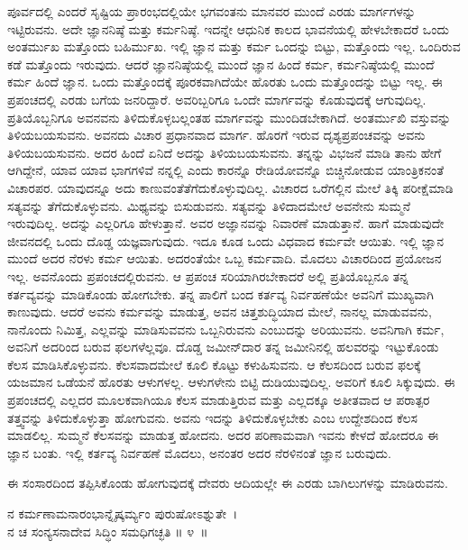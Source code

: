 ಪೂರ್ವದಲ್ಲಿ ಎಂದರೆ ಸೃಷ್ಟಿಯ ಪ್ರಾರಂಭದಲ್ಲಿಯೇ ಭಗವಂತನು ಮಾನವರ ಮುಂದೆ ಎರಡು ಮಾರ್ಗಗಳನ್ನು ಇಟ್ಟಿರುವನು. ಅದೇ ಜ್ಞಾನನಿಷ್ಠೆ ಮತ್ತು ಕರ್ಮನಿಷ್ಠೆ. ಇದನ್ನೇ ಆಧುನಿಕ ಕಾಲದ ಭಾವನೆಯಲ್ಲಿ ಹೇಳಬೇಕಾದರೆ ಒಂದು ಅಂತರ್ಮುಖ ಮತ್ತೊಂದು ಬಹಿರ್ಮುಖ. ಇಲ್ಲಿ ಜ್ಞಾನ ಮತ್ತು ಕರ್ಮ ಒಂದನ್ನು ಬಿಟ್ಟು, ಮತ್ತೊಂದು ಇಲ್ಲ. ಒಂದಿರುವ ಕಡೆ ಮತ್ತೊಂದು ಇರುವುದು. ಆದರೆ ಜ್ಞಾನನಿಷ್ಠೆಯಲ್ಲಿ ಮುಂದೆ ಜ್ಞಾನ ಹಿಂದೆ ಕರ್ಮ, ಕರ್ಮನಿಷ್ಠೆಯಲ್ಲಿ ಮುಂದೆ ಕರ್ಮ ಹಿಂದೆ ಜ್ಞಾನ. ಒಂದು ಮತ್ತೊಂದಕ್ಕೆ ಪೂರಕವಾಗಿದೆಯೇ ಹೊರತು ಒಂದು ಮತ್ತೊಂದನ್ನು ಬಿಟ್ಟು ಇಲ್ಲ. ಈ ಪ್ರಪಂಚದಲ್ಲಿ ಎರಡು ಬಗೆಯ ಜನರಿದ್ದಾರೆ. ಅವರಿಬ್ಬರಿಗೂ ಒಂದೇ ಮಾರ್ಗವನ್ನು ಕೊಡುವುದಕ್ಕೆ ಆಗುವುದಿಲ್ಲ. ಪ್ರತಿಯೊಬ್ಬನಿಗೂ ಅವನವನು ತಿಳಿದುಕೊಳ್ಳಬಲ್ಲಂತಹ ಮಾರ್ಗವನ್ನು ಮುಂದಿಡಬೇಕಾಗಿದೆ. ಅಂತರ್ಮುಖಿ ವಸ್ತುವನ್ನು ತಿಳಿಯಬಯಸು\-ವನು. ಅವನದು ವಿಚಾರ ಪ್ರಧಾನವಾದ ಮಾರ್ಗ. ಹೊರಗೆ ಇರುವ ದೃಶ್ಯಪ್ರಪಂಚವನ್ನು ಅವನು ತಿಳಿಯಬಯಸು\-ವನು. ಅದರ ಹಿಂದೆ ಏನಿದೆ ಅದನ್ನು ತಿಳಿಯಬಯಸುವನು. ತನ್ನನ್ನು ವಿಭಜನೆ ಮಾಡಿ ತಾನು ಹೇಗೆ ಆಗಿದ್ದೇನೆ, ಯಾವ ಯಾವ ಭಾಗಗಳಿವೆ ನನ್ನಲ್ಲಿ ಎಂದು ಕಾರನ್ನೊ ರೇಡಿಯೋವನ್ನೊ ಬಿಚ್ಚಿನೋಡುವ ಯಾಂತ್ರಿಕನಂತೆ ವಿಚಾರಪರ. ಯಾವುದನ್ನೂ ಅದು ಕಾಣುವಂತೆ\break ತೆಗೆದುಕೊಳ್ಳುವುದಿಲ್ಲ. ವಿಚಾರದ ಒರೆಗಲ್ಲಿನ ಮೇಲೆ ತಿಕ್ಕಿ ಪರೀಕ್ಷೆಮಾಡಿ ಸತ್ಯವನ್ನು ತೆಗೆದುಕೊಳ್ಳು\-ವನು. ಮಿಥ್ಯವನ್ನು ಬಿಸುಡುವನು. ಸತ್ಯವನ್ನು ತಿಳಿದಾದಮೇಲೆ ಅವನೇನು ಸುಮ್ಮನೆ ಇರುವುದಿಲ್ಲ. ಅದನ್ನು ಎಲ್ಲರಿಗೂ ಹೇಳುತ್ತಾನೆ. ಅವರ ಅಜ್ಞಾನವನ್ನು ನಿವಾರಣೆ ಮಾಡುತ್ತಾನೆ. ಹಾಗೆ ಮಾಡುವುದೇ ಜೀವನದಲ್ಲಿ ಒಂದು ದೊಡ್ಡ ಯಜ್ಞವಾಗುವುದು. ಇದೂ ಕೂಡ ಒಂದು ವಿಧವಾದ ಕರ್ಮವೇ ಆಯಿತು. ಇಲ್ಲಿ ಜ್ಞಾನ ಮುಂದೆ ಅದರ ನೆರಳು ಕರ್ಮ ಆಯಿತು. ಅದರಂತೆಯೇ ಒಬ್ಬ ಕರ್ಮವಾದಿ. ಮೊದಲು ವಿಚಾರದಿಂದ ಪ್ರಯೋಜನ ಇಲ್ಲ. ಅವನೊಂದು ಪ್ರಪಂಚದಲ್ಲಿರುವನು. ಆ ಪ್ರಪಂಚ ಸರಿಯಾಗಿರಬೇಕಾದರೆ ಅಲ್ಲಿ ಪ್ರತಿಯೊಬ್ಬನೂ ತನ್ನ ಕರ್ತವ್ಯವನ್ನು ಮಾಡಿಕೊಂಡು ಹೋಗಬೇಕು. ತನ್ನ ಪಾಲಿಗೆ ಬಂದ ಕರ್ತವ್ಯ ನಿರ್ವಹಣೆಯೇ ಅವನಿಗೆ ಮುಖ್ಯವಾಗಿ ಕಾಣುವುದು. ಆದರೆ ಅವನು ಕರ್ಮವನ್ನು ಮಾಡುತ್ತ, ಅವನ ಚಿತ್ತಶುದ್ಧಿಯಾದ ಮೇಲೆ, ನಾನಲ್ಲ ಮಾಡುವವನು, ನಾನೊಂದು ನಿಮಿತ್ತ, ಎಲ್ಲವನ್ನು ಮಾಡಿಸುವವನು ಒಬ್ಬನಿರುವನು ಎಂಬುದನ್ನು ಅರಿಯುವನು. ಅವನಿಗಾಗಿ ಕರ್ಮ, ಅವನಿಗೆ ಅದರಿಂದ ಬರುವ ಫಲಗಳೆಲ್ಲವೂ. ದೊಡ್ಡ ಜಮೀನ್​ದಾರ ತನ್ನ ಜಮೀನಿನಲ್ಲಿ ಹಲವರನ್ನು ಇಟ್ಟುಕೊಂಡು ಕೆಲಸ ಮಾಡಿಸಿಕೊಳ್ಳುವನು. ಕೆಲಸವಾದಮೇಲೆ ಕೂಲಿ ಕೊಟ್ಟು ಕಳುಹಿಸುವನು. ಆ ಕೆಲಸದಿಂದ ಬರುವ ಫಲಕ್ಕೆ ಯಜಮಾನ ಒಡೆಯನೆ ಹೊರತು ಆಳುಗಳಲ್ಲ. ಆಳುಗಳೇನು ಬಿಟ್ಟಿ ದುಡಿಯುವುದಿಲ್ಲ. ಅವರಿಗೆ ಕೂಲಿ ಸಿಕ್ಕುವುದು. ಈ ಪ್ರಪಂಚದಲ್ಲಿ ಎಲ್ಲದರ ಮೂಲಕವಾಗಿಯೂ ಕೆಲಸ ಮಾಡುತ್ತಿರುವ ಮತ್ತು ಎಲ್ಲದಕ್ಕೂ ಅತೀತವಾದ ಆ ಪರಾತ್ಪರ ತತ್ತ್ವವನ್ನು ತಿಳಿದುಕೊಳ್ಳುತ್ತಾ ಹೋಗುವನು. ಅವನು ಇದನ್ನು ತಿಳಿದುಕೊಳ್ಳಬೇಕು ಎಂಬ ಉದ್ದೇಶದಿಂದ ಕೆಲಸ ಮಾಡಲಿಲ್ಲ. ಸುಮ್ಮನೆ ಕೆಲಸವನ್ನು ಮಾಡುತ್ತ ಹೋದನು. ಅದರ ಪರಿಣಾಮವಾಗಿ ಇವನು ಕೇಳದೆ ಹೋದರೂ ಈ ಜ್ಞಾನ ಬಂತು. ಇಲ್ಲಿ ಕರ್ತವ್ಯ ನಿರ್ವಹಣೆ ಮೊದಲು, ಅನಂತರ ಅದರ ನೆರಳಿನಂತೆ ಜ್ಞಾನ ಬರುವುದು.

ಈ ಸಂಸಾರದಿಂದ ತಪ್ಪಿಸಿಕೊಂಡು ಹೋಗುವುದಕ್ಕೆ ದೇವರು ಆದಿಯಲ್ಲೇ ಈ ಎರಡು ಬಾಗಿಲುಗಳನ್ನು ಮಾಡಿರುವನು.

\begin{shloka}
ನ ಕರ್ಮಣಾಮನಾರಂಭಾನ್ನೈಷ್ಕರ್ಮ್ಯಂ ಪುರುಷೋಽಶ್ನುತೇ~।\\ನ ಚ ಸಂನ್ಯಸನಾದೇವ ಸಿದ್ಧಿಂ ಸಮಧಿಗಚ್ಛತಿ \hfill॥ ೪~॥
\end{shloka}

